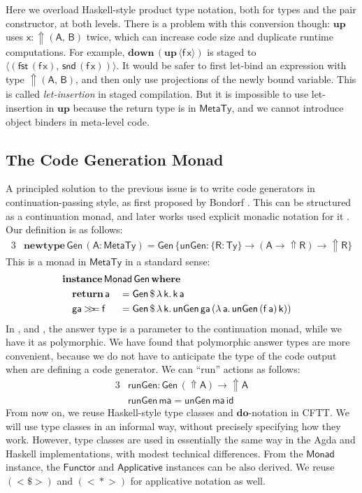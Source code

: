 \documentclass[acmsmall,screen]{acmart}
\newcommand{\mit}[1]{{\mathsf{#1}}}
\newcommand{\msf}[1]{{\mathsf{#1}}}
\newcommand{\mbf}[1]{{\mathbf{#1}}}
\newcommand{\bs}[1]{\boldsymbol{#1}}
\newcommand{\ind}{\hspace{1em}}
\newcommand{\return}{\mbf{return}\,}
\newcommand{\lam}{\lambda\,}
\newcommand{\where}{\mbf{where}}
\newcommand{\vma}{\mathsf{ma}}
\newcommand{\vk}{\mathsf{k}}
\newcommand{\vA}{\mathsf{A}}
\newcommand{\vB}{\mathsf{B}}
\newcommand{\vR}{\mathsf{R}}
\newcommand{\va}{\mathsf{a}}
\newcommand{\vx}{\mathsf{x}}
\newcommand{\vf}{\mathsf{f}}
\newcommand{\Monad}{\msf{Monad}}
\newcommand{\Applicative}{\msf{Applicative}}
\newcommand{\Functor}{\msf{Functor}}
\newcommand{\Up}{{\Uparrow}}
\newcommand{\ql}{{\bs{\langle}}}
\newcommand{\qr}{{\bs{\rangle}}}
\newcommand{\bind}{\mathbin{>\!\!>\mkern-6.7mu=}}
\newcommand{\MTy}{\msf{MetaTy}}
\newcommand{\Ty}{\msf{Ty}}
\newcommand{\fst}{\msf{fst}}
\newcommand{\snd}{\msf{snd}}
\theoremstyle{remark}
\newcommand{\id}{\mit{id}}
\newcommand{\mup}{\mbf{up}}
\newcommand{\mdown}{\mbf{down}}
\newcommand{\instance}{\mbf{instance}\,}
\newcommand{\Gen}{\msf{Gen}}
\newcommand{\unGen}{\mit{unGen}}
\newcommand{\fmap}{<\!\!\$\!\!>}
\newcommand{\ap}{{<\!\!*\!\!>}}
\newcommand{\runGen}{\mit{runGen}}
\newcommand{\newtype}{\mbf{newtype}\,}
\newcommand{\dlr}{\,\$\,}
\begin{document}
Here we overload Haskell-style product type notation, both for types and the
pair constructor, at both levels. There is a problem with this conversion
though: $\mup$ uses $\vx : \Up(\vA,\,\vB)$ twice, which can increase code size
and duplicate runtime computations. For example, $\mdown\,({\mup\,\ql \vf\,\vx
  \qr})$ is staged to $\ql (\fst\,(\vf\,\vx),\,\snd\,(\vf\,\vx)) \qr$. It would
be safer to first let-bind an expression with type $\Up(\vA,\,\vB)$, and then
only use projections of the newly bound variable. This is called
\emph{let-insertion} in staged compilation. But it is impossible to use
let-insertion in $\mup$ because the return type is in $\MTy$, and we cannot
introduce object binders in meta-level code.

\subsection{The Code Generation Monad}\label{sec:the-code-generation-monad}

A principled solution to the previous issue is to write code generators in
continuation-passing style, as first proposed by Bondorf
\cite{DBLP:conf/lfp/Bondorf92}. This can be structured as a continuation monad,
and later works used explicit monadic notation for it
\cite{DBLP:conf/emsoft/KiselyovST04,DBLP:journals/scp/CaretteK11,DBLP:conf/pepm/SwadiTKP06}. Our
definition is as follows:
\begin{alignat*}{3}
  & \newtype \Gen\,(\vA : \MTy) = \Gen\,\{\unGen : \{\vR : \Ty\} \to (\vA \to \Up \vR) \to \Up \vR\}
\end{alignat*}
This is a monad in $\MTy$ in a standard sense:
\begin{alignat*}{3}
  &\mathrlap{\instance \Monad\,\Gen\,\where}\\
  &\ind \return \va        &&= \Gen \dlr \lam \vk.\,\vk\,\va\\
  &\ind \mit{ga} \bind \vf &&= \Gen \dlr \lam \vk.\,\unGen\,\mit{ga}\,(\lam \va.\,\unGen\,(\vf\,\va)\,\vk))
\end{alignat*}
In \cite{DBLP:conf/emsoft/KiselyovST04},\cite{DBLP:journals/scp/CaretteK11} and
\cite{DBLP:conf/pepm/SwadiTKP06}, the answer type is a parameter to the
continuation monad, while we have it as polymorphic. We have found that
polymorphic answer types are more convenient, because we do not have to
anticipate the type of the code output when are defining a code generator. We
can ``run'' actions as follows:
\begin{alignat*}{3}
  &\runGen : \Gen\,(\Up \vA) \to \Up \vA\\
  &\runGen\,\vma = \unGen\,\vma\,\id
\end{alignat*}
From now on, we reuse Haskell-style type classes and $\mbf{do}$-notation in
CFTT. We will use type classes in an informal way, without precisely specifying
how they work. However, type classes are used in essentially the same way in the
Agda and Haskell implementations, with modest technical differences.  From the
$\Monad$ instance, the $\Functor$ and $\Applicative$ instances can be also
derived. We reuse $({\fmap})$ and $({\ap})$ for applicative notation as well.
\end{document}
